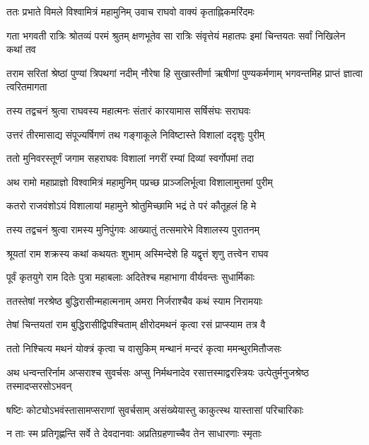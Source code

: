 \twolineshloka
{ततः प्रभाते विमले विश्वामित्रं महामुनिम्}
{उवाच राघवो वाक्यं कृताह्निकमरिंदमः} %

\threelineshloka
{गता भगवती रात्रिः श्रोतव्यं परमं श्रुतम्}
{क्षणभूतेव सा रात्रिः संवृत्तेयं महातपः}
{इमां चिन्तयतः सर्वां निखिलेन कथां तव} %

\threelineshloka
{तराम सरितां श्रेष्ठां पुण्यां त्रिपथगां नदीम्}
{नौरेषा हि सुखास्तीर्णा ऋषीणां पुण्यकर्मणाम्}
{भगवन्तमिह प्राप्तं ज्ञात्वा त्वरितमागता} %

\twolineshloka
{तस्य तद्वचनं श्रुत्वा राघवस्य महात्मनः}
{संतारं कारयामास सर्षिसंघः सराघवः} %

\twolineshloka
{उत्तरं तीरमासाद्य संपूज्यर्षिगणं तथ}
{गङ्गाकूले निविष्टास्ते विशालां ददृशुः पुरीम्} %

\twolineshloka
{ततो मुनिवरस्तूर्णं जगाम सहराघवः}
{विशालां नगरीं रम्यां दिव्यां स्वर्गोपमां तदा} %

\twolineshloka
{अथ रामो महाप्राज्ञो विश्वामित्रं महामुनिम्}
{पप्रच्छ प्राञ्जलिर्भूत्वा विशालामुत्तमां पुरीम्} %

\twolineshloka
{कतरो राजवंशोऽयं विशालायां महामुने}
{श्रोतुमिच्छामि भद्रं ते परं कौतूहलं हि मे} %

\twolineshloka
{तस्य तद्वचनं श्रुत्वा रामस्य मुनिपुंगवः}
{आख्यातुं तत्समारेभे विशालस्य पुरातनम्} %

\twolineshloka
{श्रूयतां राम शक्रस्य कथां कथयतः शुभाम्}
{अस्मिन्देशे हि यद्वृत्तं शृणु तत्त्वेन राघव} %

\twolineshloka
{पूर्वं कृतयुगे राम दितेः पुत्रा महाबलाः}
{अदितेश्च महाभागा वीर्यवन्तः सुधार्मिकाः} %

\twolineshloka
{ततस्तेषां नरश्रेष्ठ बुद्धिरासीन्महात्मनाम्}
{अमरा निर्जराश्चैव कथं स्याम निरामयाः} %

\twolineshloka
{तेषां चिन्तयतां राम बुद्धिरासीद्विपश्चिताम्}
{क्षीरोदमथनं कृत्वा रसं प्राप्स्याम तत्र वै} %

\twolineshloka
{ततो निश्चित्य मथनं योक्त्रं कृत्वा च वासुकिम्}
{मन्थानं मन्दरं कृत्वा ममन्थुरमितौजसः} %

\threelineshloka
{अथ धन्वन्तरिर्नाम अप्सराश्च सुवर्चसः}
{अप्सु निर्मथनादेव रसात्तस्माद्वरस्त्रियः}
{उत्पेतुर्मनुजश्रेष्ठ तस्मादप्सरसोऽभवन्} %

\twolineshloka
{षष्टिः कोट्योऽभवंस्तासामप्सराणां सुवर्चसाम्}
{असंख्येयास्तु काकुत्स्थ यास्तासां परिचारिकाः} %

\twolineshloka
{न ताः स्म प्रतिगृह्णन्ति सर्वे ते देवदानवाः}
{अप्रतिग्रहणाच्चैव तेन साधारणाः स्मृताः} %

